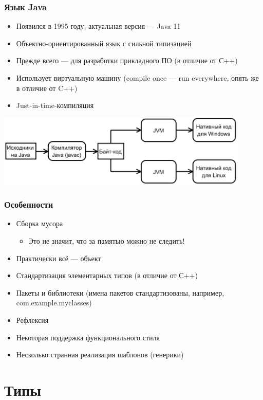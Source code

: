 \documentclass[xetex,mathserif,serif]{beamer}
\begin{document}
	\begin{frame}
		\frametitle{Язык Java}
		\begin{itemize}
			\item Появился в 1995 году, актуальная версия --- Java 11
			\item Объектно-ориентированный язык с сильной типизацией
			\item Прежде всего --- для разработки прикладного ПО (в отличие от С++)
			\item Использует виртуальную машину (compile once --- run everywhere, опять же в отличие от C++)
			\item Just-in-time-компиляция
		\end{itemize}
		\begin{center}
			\includegraphics[width=0.9\textwidth]{javaCompiling.png}
		\end{center}
	\end{frame}

	\begin{frame}
		\frametitle{Особенности}
		\begin{itemize}
			\item Сборка мусора
			\begin{itemize}
				\item Это не значит, что за памятью можно не следить!
			\end{itemize}
			\item Практически всё --- объект
			\item Стандартизация элементарных типов (в отличие от С++)
			\item Пакеты и библиотеки (имена пакетов стандартизованы, например, com.example.myclasses)
			\item Рефлексия
			\item Некоторая поддержка функционального стиля
			\item Несколько странная реализация шаблонов (генерики)
		\end{itemize}
	\end{frame}

	\section{Типы}
\end{document}
